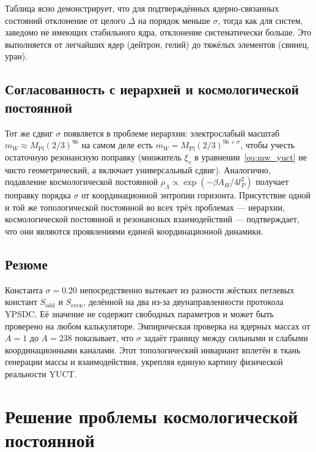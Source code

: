 \documentclass[11pt,a4paper]{article}
\theoremstyle{remark}
\begin{document}
	Таблица ясно демонстрирует, что для подтверждённых ядерно-связанных состояний отклонение от целого \(\Delta\) на порядок меньше \(\sigma\), тогда как для систем, заведомо не имеющих стабильного ядра, отклонение систематически больше. Это выполняется от легчайших ядер (дейтрон, гелий) до тяжёлых элементов (свинец, уран).
	
	\subsection{Согласованность с иерархией и космологической постоянной}
	
	Тот же сдвиг \(\sigma\) появляется в проблеме иерархии: электрослабый масштаб \(m_W \approx M_{\mathrm{Pl}}(2/3)^{96}\) на самом деле есть \(m_W = M_{\mathrm{Pl}} (2/3)^{96+\sigma}\), чтобы учесть остаточную резонансную поправку (множитель \(\xi_v\) в уравнении~\ref{eq:mw_yuct} не чисто геометрический, а включает универсальный сдвиг). Аналогично, подавление космологической постоянной \(\rho_\Lambda \propto \exp(-\beta A_H/4l_P^2)\) получает поправку порядка \(\sigma\) от координационной энтропии горизонта. Присутствие одной и той же топологической постоянной во всех трёх проблемах — иерархии, космологической постоянной и резонансных взаимодействий — подтверждает, что они являются проявлениями единой координационной динамики.
	
	\subsection{Резюме}
	
	Константа \(\sigma = 0.20\) непосредственно вытекает из разности жёстких петлевых констант \(S_{\mathrm{odd}}\) и \(S_{\mathrm{even}}\), делённой на два из-за двунаправленности протокола YPSDC. Её значение не содержит свободных параметров и может быть проверено на любом калькуляторе. Эмпирическая проверка на ядерных массах от \(A=1\) до \(A=238\) показывает, что \(\sigma\) задаёт границу между сильными и слабыми координационными каналами. Этот топологический инвариант вплетён в ткань генерации массы и взаимодействия, укрепляя единую картину физической реальности YUCT.
	
	\section{Решение проблемы космологической постоянной}
	
\end{document}
